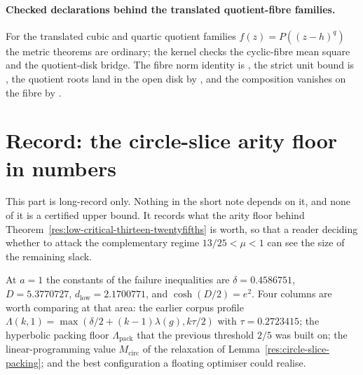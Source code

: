 \documentclass[11pt]{article}
\begin{document}
\paragraph{Checked declarations behind the translated quotient-fibre families.}
For the translated cubic and quartic quotient families $f(z)=P((z-h)^q)$ the
metric theorems are ordinary; the kernel checks the cyclic-fibre mean square
and the quotient-disk bridge.  The fibre norm identity is
, the strict unit bound is
, the quotient roots land in the open disk by
, and the composition vanishes on the fibre by
.
\section{Record: the circle-slice arity floor in numbers}
\label{sec:record-circle-slice}

This part is long-record only.  Nothing in the short note depends on it, and
none of it is a certified upper bound.  It records what the arity floor behind
Theorem~\ref{res:low-critical-thirteen-twentyfifths} is worth, so that a reader
deciding whether to attack the complementary regime $13/25<\mu<1$ can see the
size of the remaining slack.

At $a=1$ the constants of the failure inequalities are
$\delta=0.4586751$, $D=5.3770727$, $d_{\mathrm{low}}=2.1700771$, and
$\cosh(D/2)=e^{2}$.  Four columns are worth comparing at that area: the
earlier corpus profile $\Lambda(k,1)=\max(\delta/2+(k-1)\lambda(g),k\tau/2)$
with $\tau=0.2723415$; the hyperbolic packing floor $\Lambda_{\mathrm{pack}}$
that the previous threshold $2/5$ was built on; the linear-programming value
$M_{\mathrm{circ}}$ of the relaxation of
Lemma~\ref{res:circle-slice-packing}; and the best configuration a floating
optimiser could realise.
\end{document}
